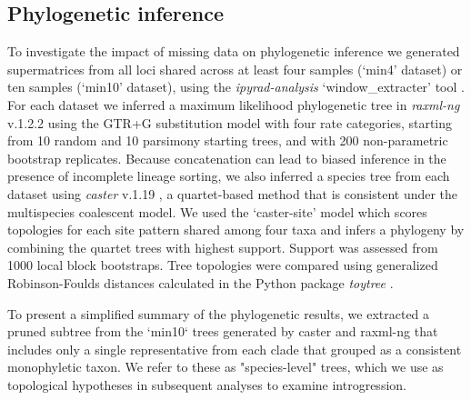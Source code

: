 \documentclass[11pt]{article}
\begin{document}
\subsection{Phylogenetic inference}
To investigate the impact of missing data on phylogenetic inference 
we generated supermatrices from all loci shared across at least four 
samples (`min4' dataset) or ten samples (`min10' dataset), using the
\emph{ipyrad-analysis} ‘window\_extracter’ tool \citep{eaton_ipyrad_2020}.
% 
For each dataset we inferred a maximum likelihood phylogenetic tree in
\emph{raxml-ng} v.1.2.2 \citep{kozlov_raxml-ng_2019} using the GTR+G substitution
model with four rate categories, starting from 10 random and 10 parsimony 
starting trees, and with 200 non-parametric bootstrap replicates. 
% 
Because concatenation can lead to biased inference in the presence of incomplete
lineage sorting, we also inferred a species tree from each dataset using 
\emph{caster} v.1.19 \citep{doi:10.1126/science.adk9688}, 
a quartet-based method that is 
consistent under the multispecies coalescent model. 
We used the `caster-site’ model which scores topologies for each site pattern 
shared among four taxa and infers a phylogeny by combining the quartet
trees with highest support. Support was assessed from 1000 local block bootstraps. 
% 
Tree topologies were compared using generalized Robinson-Foulds distances 
calculated in the Python package \emph{toytree} \citep{eaton_toytree_2020}. 


To present a simplified summary of the phylogenetic results, we extracted
a pruned subtree from the `min10` trees generated by caster and raxml-ng 
that includes only a single representative from each clade that grouped
as a consistent monophyletic taxon. 
We refer to these as "species-level" trees, which we use as topological
hypotheses in subsequent analyses to examine introgression.
\end{document}
